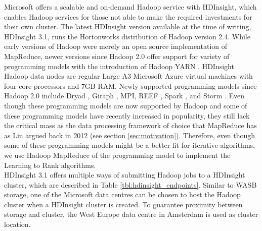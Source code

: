 Microsoft offers a scalable and on-demand Hadoop service with HDInsight, which enables Hadoop services for those not able to make the required investments for their own cluster. The latest HDInsight version available at the time of writing, HDInsight 3.1, runs the Hortonworks distribution of Hadoop version 2.4. While early versions of Hadoop were merely an open source implementation of MapReduce, newer versions since Hadoop 2.0 offer support for variety of programming models with the introduction of Hadoop YARN \cite{Vavilapalli2013}. HDInsight Hadoop data nodes are regular Large A3 Microsoft Azure virtual machines with four core processors and 7GB RAM. Newly supported programming models since Hadoop 2.0 include Dryad \cite{Isard2007}, Giraph \cite{Avery2011}, MPI, REEF \cite{Chun2013}, Spark \cite{Zaharia2010}, and Storm \cite{Aniello2013}. Even though these programming models are now supported by Hadoop and some of these programming models have recently increased in popularity, they still lack the critical mass as the data processing framework of choice that MapReduce has as Lin argued back in 2012 \cite{Lin2013} (see section \ref{sec:motivation}). Therefore, even though some of these programming models might be a better fit for iterative algorithms, we use Hadoop MapReduce of the programming model to implement the Learning to Rank algorithms.\\

HDInsight 3.1 offers multiple ways of submitting Hadoop jobs to a HDInsight cluster, which are described in Table \ref{tbl:hdinsight_endpoints}. Similar to \ac{WASB} storage, one of the Microsoft data centres can be chosen to host the Hadoop cluster when a HDInsight cluster is created. To guarantee proximity between storage and cluster, the West Europe data centre in Amsterdam is used as cluster location.\\

